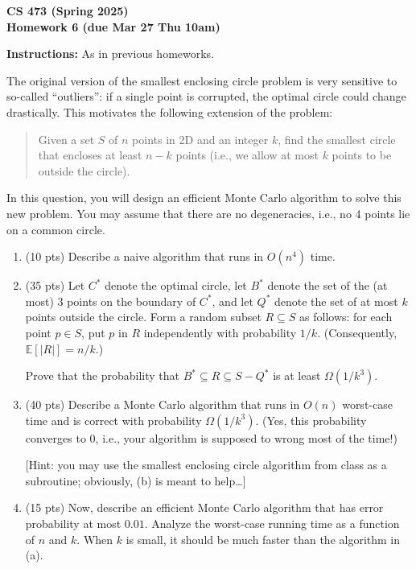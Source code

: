 \documentclass[11pt]{article}
\newcommand{\Ex}{\mathbb{E}}
\begin{document}
\begin{center}\Large\bf 
CS 473 (Spring 2025)\\
Homework 6 (due Mar 27 Thu 10am)
\end{center}

\medskip\noindent
{\bf Instructions:} As in previous homeworks.

\begin{description}
\bigskip
\item[Problem 6.1:]
The original version of the smallest enclosing circle problem
is very sensitive to so-called ``outliers'': if a single
point is corrupted, the optimal circle could change drastically.
This motivates the following extension of the problem:
\begin{quote}
Given a set $S$ of $n$ points in 2D and an integer $k$, find the
smallest circle that encloses at least $n-k$ points (i.e.,
we allow at most $k$ points to be outside the circle).
\end{quote}
In this question, you will design an efficient Monte Carlo
algorithm to solve this new problem.  You may assume that there are no
degeneracies, i.e., no 4 points lie on a common circle.

\begin{enumerate}
\item[(a)] (10 pts) Describe a naive algorithm that runs in $O(n^4)$ time.

\smallskip
\item[(b)] (35 pts) Let $C^*$ denote the optimal circle, let $B^*$
denote the set of the (at most) 3 points on the boundary of $C^*$,
 and 
let $Q^*$ denote the set of at most $k$ points outside the
circle.  
Form a random subset $R\subseteq S$ as follows:
for each point $p\in S$, put $p$ in $R$ independently with probability $1/k$.
(Consequently, $\Ex[|R|]=n/k$.)  

Prove that the probability
that $B^*\subseteq R\subseteq S-Q^*$ is at least $\Omega(1/k^3)$.

\smallskip
\item[(c)] (40 pts) Describe a Monte Carlo algorithm that runs in
$O(n)$ worst-case time and is correct with probability 
$\Omega(1/k^3)$.
(Yes, this probability converges to 0, i.e., your
algorithm is supposed to wrong most of the time!)

[Hint: you may use the smallest enclosing circle algorithm
from class as a subroutine; 
obviously, (b) is meant to help\ldots]

\smallskip
\item[(d)] (15 pts) Now, describe an efficient Monte Carlo algorithm that has error probability at most $0.01$.  Analyze the worst-case running time as a function of $n$ and $k$.  When $k$ is small, it should be much faster than the algorithm in (a).
\end{enumerate}


\end{description}
\end{document}
